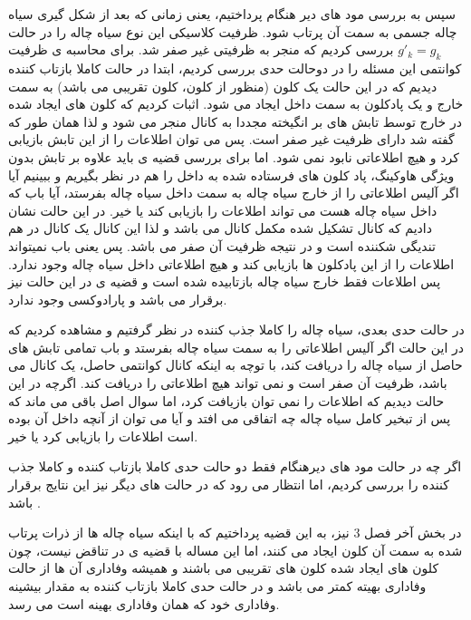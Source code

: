 سپس به بررسی مود های دیر هنگام پرداختیم، یعنی زمانی که بعد از شکل گیری سیاه چاله جسمی به سمت آن پرتاب شود. ظرفیت کلاسیکی این نوع سیاه چاله را در حالت
$g'_k = g_k$
بررسی کردیم که منجر به ظرفیتی غیر صفر شد. برای محاسبه ی ظرفیت کوانتمی
این مسئله را در دوحالت حدی بررسی کردیم، ابتدا در حالت کاملا بازتاب کننده دیدیم که در این حالت یک کلون (منظور از کلون، کلون تقریبی می باشد)
به سمت خارج و یک پادکلون به سمت داخل ایجاد می شود. اثبات کردیم که کلون های ایجاد شده در خارج توسط تابش های بر انگیخته مجددا به کانال 
منجر می شود و لذا همان طور که گفته شد دارای ظرفیت غیر صفر است. پس می توان اطلاعات را از این تابش بازیابی کرد و هیچ اطلاعاتی نابود نمی شود. اما برای بررسی قضیه ی 
باید علاوه بر تابش بدون ویژگی هاوکینگ، پاد کلون های فرستاده شده به داخل را هم در نظر بگیریم و ببینیم آیا اگر آلیس اطلاعاتی را از خارج سیاه چاله به سمت داخل سیاه چاله بفرستد، آیا باب که داخل سیاه چاله هست می تواند اطلاعات را بازیابی کند یا خیر. در این حالت نشان دادیم که کانال تشکیل شده مکمل کانال 
می باشد و لذا این کانال یک کانال در هم تندیگی شکننده است و در نتیجه ظرفیت آن صفر می باشد. پس یعنی باب نمیتواند اطلاعات را از این پادکلون ها بازیابی کند و هیچ اطلاعاتی داخل سیاه چاله وجود ندارد. پس اطلاعات فقط خارج سیاه چاله بازتابیده شده است و قضیه ی 
در این حالت نیز برقرار می باشد و پارادوکسی وجود ندارد.




در حالت حدی بعدی، سیاه چاله را کاملا جذب کننده در نظر گرفتیم و مشاهده کردیم که در این حالت اگر آلیس اطلاعاتی را به سمت سیاه چاله بفرستد و باب تمامی تابش های حاصل از سیاه چاله را دریافت کند، با توچه به اینکه کانال کوانتمی حاصل، یک کانال 
می باشد، ظرفیت آن صفر است و نمی تواند هیچ اطلاعاتی را دریافت کند. اگرچه در این حالت دیدیم که اطلاعات را نمی توان بازیافت کرد، اما سوال اصل باقی می ماند که پس از تبخیر کامل سیاه چاله چه اتفاقی می افتد و آیا می توان از آنچه داخل آن بوده است اطلاعات را بازیابی کرد یا خیر.

اگر چه در حالت مود های دیرهنگام فقط دو حالت حدی کاملا بازتاب کننده و کاملا جذب کننده را بررسی کردیم، اما انتظار می رود که در حالت های دیگر نیز این نتایج برقرار باشد
\cite{qit}
.

در بخش آخر فصل 3 نیز، به این قضیه پرداختیم که با اینکه سیاه چاله ها از ذرات پرتاب شده به سمت آن کلون ایجاد می کنند، اما این مساله با قضیه ی 
در تناقض نیست، چون کلون های ایجاد شده کلون های تقریبی می باشند و همیشه وفاداری آن ها از حالت وفاداری بهیته کمتر می باشد و در حالت حدی کاملا بازتاب کننده به مقدار بیشینه وفاداری خود که همان وفاداری بهینه است می رسد.